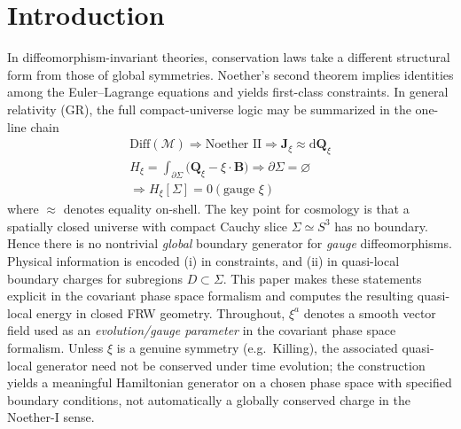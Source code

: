 \documentclass[
  reprint,
  amsmath,amssymb,
  aps,
  prd,
  superscriptaddress,
  nofootinbib,
  longbibliography
]{revtex4-2}
\newcommand{\dd}{\mathrm{d}}
\newcommand{\M}{\mathcal{M}}
\newcommand{\J}{\bm{J}}
\newcommand{\Q}{\bm{Q}}
\newcommand{\Bnd}{\bm{B}}
\begin{document}
\section{Introduction}
In diffeomorphism-invariant theories, conservation laws take a different structural form from those of global symmetries.
Noether's second theorem implies identities among the Euler--Lagrange equations and yields first-class constraints.
In general relativity (GR), the full compact-universe logic may be summarized in the one-line chain
\begin{equation}
\boxed{
\begin{gathered}
\mathrm{Diff}(\M)\Rightarrow \text{Noether II}\Rightarrow \J_{\xi}\approx \dd \Q_{\xi}\\
H_{\xi}=\int_{\partial\Sigma}\bigl(\Q_{\xi}-\xi\cdot\Bnd\bigr)
\Rightarrow \partial\Sigma=\varnothing\\
\Rightarrow H_{\xi}[\Sigma]=0 (\text{gauge }\xi)
\end{gathered}
}
\label{eq:masterChainBox}
\end{equation}
where $\approx$ denotes equality on-shell.
The key point for cosmology is that a spatially closed universe with compact Cauchy slice $\Sigma\simeq S^{3}$ has no boundary.
Hence there is no nontrivial \emph{global} boundary generator for \emph{gauge} diffeomorphisms.
Physical information is encoded (i) in constraints, and (ii) in quasi-local boundary charges for subregions $D\subset\Sigma$.
This paper makes these statements explicit in the covariant phase space formalism and computes the resulting quasi-local energy in closed FRW geometry.
Throughout, $\xi^a$ denotes a smooth vector field used as an \emph{evolution/gauge parameter} in the covariant phase space formalism.
Unless $\xi$ is a genuine symmetry (e.g.\ Killing), the associated quasi-local generator need not be conserved under time evolution; the construction yields a meaningful Hamiltonian generator on a chosen phase space with specified boundary conditions, not automatically a globally conserved charge in the Noether-I sense.
\end{document}
